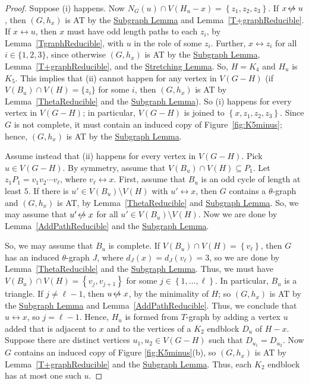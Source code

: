 \documentclass[12pt]{article}
\theoremstyle{plain}
\theoremstyle{definition}
\theoremstyle{remark}
\newcommand{\set}[1]{\left\{ #1 \right\}}
\newcommand{\irange}[1]{\left\{1,\ldots,#1\right\}}
\def\adj{\leftrightarrow}
\def\nonadj{\not\!\leftrightarrow}
\begin{document}
\begin{proof}
Suppose (i) happens. Now $N_G(u) \cap V(H_u - x) = \set{z_1,z_2,z_3}$. If $x
\nonadj u$, then $(G,h_x)$ is AT by the \hyperref[InducedSubgraph]{Subgraph
Lemma} and Lemma~\ref{T+graphReducible}.  If $x \adj u$, then $x$ must have odd
length paths to each $z_i$, by Lemma~\ref{TgraphReducible}, with $u$ in the role
of some $z_i$.  Further, $x \adj z_i$ for all $i \in \{1,2,3\}$, since
otherwise $(G,h_x)$ is AT by the
\hyperref[InducedSubgraph]{Subgraph Lemma}, Lemma~\ref{T+graphReducible}, and
the \hyperref[SubdivideTwice]{Stretching Lemma}.  So, $H=K_4$ and $H_u$ is
$K_5$.  This implies that (ii) cannot happen for any vertex in $V(G-H)$ (if
$V(B_u)\cap V(H)=\{z_i\}$ for some $i$, then $(G,h_x)$ is AT by
Lemma~\ref{ThetaReducible} 
and the \hyperref[IndudcedSubgraph]{Subgraph Lemma}).
So (i) happens for every vertex in $V(G-H)$; in particular, $V(G-H)$ is joined
to $\set{x,z_1,z_2,z_3}$.  Since $G$ is not complete, it must contain an induced
copy of Figure~\ref{fig:K5minus}; hence, $(G,h_x)$ is AT by the
\hyperref[InducedSubgraph]{Subgraph Lemma}.
		
Assume instead that (ii) happens for every vertex in $V(G-H)$. Pick $u \in V(G
- H)$. By symmetry, assume that $V(B_u) \cap V(H) \subseteq P_1$.  Let $z_1P_1
= v_1v_2\cdots v_{\ell}$, where $v_{\ell}\adj x$.  First, assume that $B_u$ is
an odd cycle of length at least $5$.  If there is $u' \in V(B_u)\setminus V(H)$
with $u' \adj x$, then $G$ contains a $\theta$-graph and  $(G,h_x)$ is AT, by
Lemma~\ref{ThetaReducible} and \hyperref[InducedSubgraph]{Subgraph Lemma}.  So,
we may assume that $u' \nonadj x$ for all $u' \in V(B_u)\setminus V(H)$.  Now
we are done by Lemma~\ref{AddPathReducible} and the
\hyperref[InducedSubgraph]{Subgraph Lemma}.

So, we may assume that $B_u$ is complete. If $V(B_u) \cap V(H)=\set{v_\ell}$,
then $G$ has an induced $\theta$-graph $J$, where $d_J(x)=d_J(v_\ell)=3$, so we are
done by Lemma~\ref{ThetaReducible} and the \hyperref[IndudcedSubgraph]{Subgraph
Lemma}.  Thus, we must have $V(B_u) \cap V(H) = \set{v_{j},
v_{j+1}}$ for some $j \in \irange{\ell}$.  In particular, $B_u$ is a triangle. 
If $j \ne \ell - 1$, then $u\nonadj x$, by the minimality of $H$;
so $(G,h_x)$ is AT by the
\hyperref[InducedSubgraph]{Subgraph Lemma} and Lemma~\ref{AddPathReducible}.
Thus, we conclude that $u\adj x$, so $j=\ell-1$.  
Hence, $H_u$ is formed from $T$-graph by adding a vertex $u$ added that is
adjacent to $x$ and to the vertices of a $K_2$ endblock $D_u$ of $H-x$. 
%
Suppose there are distinct vertices $u_1, u_2\in V(G-H)$ such that $D_{u_1} =
D_{u_2}$.  Now $G$ contains an induced copy of Figure \ref{fig:K5minus}(b), so 
$(G,h_x)$ is AT by Lemma~\ref{T+graphReducible} and the
\hyperref[InducedSubgraph]{Subgraph Lemma}.  Thus, each $K_2$ endblock has at
most one such $u$.  


\end{proof}
\end{document}
